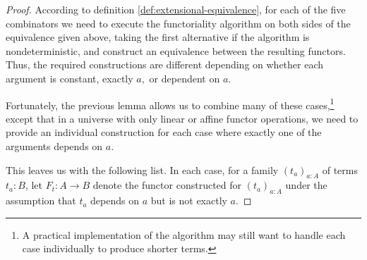 \documentclass[a4paper]{article}
\theoremstyle{definition}
\theoremstyle{remark}
\begin{document}
\begin{proof}
  According to definition \ref{def:extensional-equivalence}, for each of the
  five combinators we need to execute the functoriality algorithm on both sides of
  the equivalence given above, taking the first alternative if the algorithm is
  nondeterministic, and construct an equivalence between the resulting functors.
  Thus, the required constructions are different depending on whether each argument
  is constant, exactly $a,$ or dependent on $a.$

  Fortunately, the previous lemma allows us to combine many of these
  cases,\footnote{A practical implementation of the algorithm may still want to
  handle each case individually to produce shorter terms.}
  except that in a universe with only linear or affine functor operations, we need to
  provide an individual construction for each case where exactly one of the
  arguments depends on $a.$

  This leaves us with the following list.
  In each case, for a family $(t_a)_{a : A}$ of terms $t_a : B$, let $F_t : A \to B$
  denote the functor constructed for $(t_a)_{a : A}$ under the assumption that $t_a$
  depends on $a$ but is not exactly $a.$


\end{proof}
\end{document}

